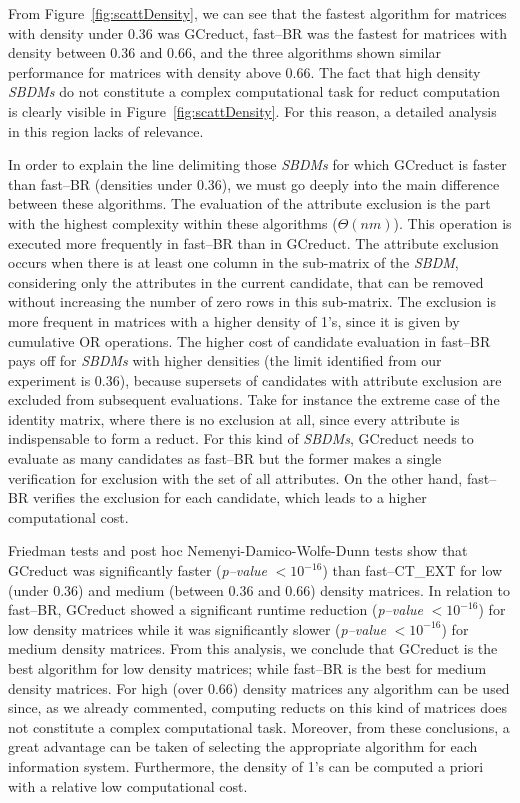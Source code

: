 \documentclass[number,preprint,review,12pt]{elsarticle}
\begin{document}
	From Figure~\ref{fig:scattDensity}, we can see that the fastest algorithm for matrices with density under 0.36 was GCreduct, fast--BR was the fastest for matrices with density between 0.36 and 0.66, and the three algorithms shown similar performance for matrices with density above 0.66. The fact that high density \textit{SBDMs} do not constitute a complex computational task for reduct computation \citep{Rojas12} is clearly visible in Figure~\ref{fig:scattDensity}. For this reason, a detailed analysis in this region lacks of relevance.
		
	In order to explain the line delimiting those \textit{SBDMs} for which GCreduct is faster than fast--BR (densities under 0.36), we must go deeply into the main difference between these algorithms. The evaluation of the attribute exclusion is the part with the highest complexity within these algorithms ($\Theta (nm)$). This operation is executed more frequently in fast--BR than in GCreduct. The attribute exclusion occurs when there is at least one column in the sub-matrix of the \textit{SBDM}, considering only the attributes in the current candidate, that can be removed without increasing the number of zero rows in this sub-matrix. The exclusion is more frequent in matrices with a higher density of 1's, since it is given by cumulative OR operations. The higher cost of candidate evaluation in fast--BR pays off for \textit{SBDMs} with higher densities (the limit identified from our experiment is 0.36), because supersets of candidates with attribute exclusion are excluded from subsequent evaluations. Take for instance the extreme case of the identity matrix, where there is no exclusion at all, since every attribute is indispensable to form a reduct. For this kind of \textit{SBDMs}, GCreduct needs to evaluate as many candidates as fast--BR but the former makes a single verification for exclusion with the set of all attributes. On the other hand, fast--BR verifies the exclusion for each candidate, which leads to a higher computational cost.
	
	Friedman tests and post hoc Nemenyi-Damico-Wolfe-Dunn tests show that GCreduct was significantly faster (\textit{p--value} $< 10^{-16}$) than fast--CT\_EXT for low (under 0.36) and medium (between 0.36 and 0.66) density matrices. In relation to fast--BR, GCreduct showed a significant runtime reduction (\textit{p--value} $< 10^{-16}$) for low density matrices while it was significantly slower (\textit{p--value} $< 10^{-16}$) for medium density matrices. From this analysis, we conclude that GCreduct is the best algorithm for low density matrices; while fast--BR is the best for medium density matrices. For high (over 0.66) density matrices any algorithm can be used since, as we already commented, computing reducts on this kind of matrices does not constitute a complex computational task. Moreover, from these conclusions, a great advantage can be taken of selecting the appropriate algorithm for each information system. Furthermore, the density of 1's can be computed a priori with a relative low computational cost.
		
\end{document}
